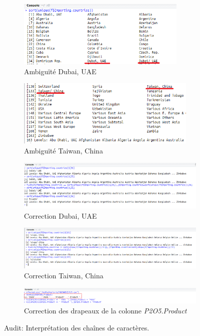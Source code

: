 	\begin{figure}[H]
	\begin{subfigure}{.5\textwidth}
			\centering
			\includegraphics[height=90pt]{ch3-images/4}
			\caption{Ambiguïté Dubai, UAE}
			\label{fig:dubai}
	\end{subfigure}
	\begin{subfigure}{.5\textwidth}
		\centering
		\includegraphics[height=90pt]{ch3-images/5}
		\caption{Ambiguïté Taiwan, China}
		\label{fig:taiwan}
	\end{subfigure}
	\begin{subfigure}{\linewidth}
			\centering
			\includegraphics[width=\linewidth]{ch3-images/6}
			\caption{Correction Dubai, UAE}
			\label{fig:corrDubai}
	\end{subfigure}
	\begin{subfigure}{\linewidth}
			\centering
			\includegraphics[width=\linewidth]{ch3-images/7}
			\caption{Correction Taiwan, China}
			\label{fig:corrTaiwan}
	\end{subfigure}
		\begin{subfigure}{\linewidth}
			\centering
			\includegraphics[width=\linewidth]{ch3-images/10}
			\caption{Correction des drapeaux de la colonne \textit{P2O5.Product}}
			\label{fig:corr}
		\end{subfigure}
			\caption{Audit: Interprétation des chaînes de caractères.}
			\end{figure}
